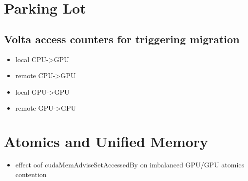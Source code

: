 \section{Parking Lot}
\subsection{Volta access counters for triggering migration}
\begin{itemize}
    \item local CPU->GPU
    \item remote CPU->GPU
    \item local GPU->GPU
    \item remote GPU->GPU
\end{itemize}


\section{Atomics and Unified Memory}
\begin{itemize}
    \item effect oof cudaMemAdviseSetAccessedBy on imbalanced GPU/GPU atomics contention
\end{itemize}